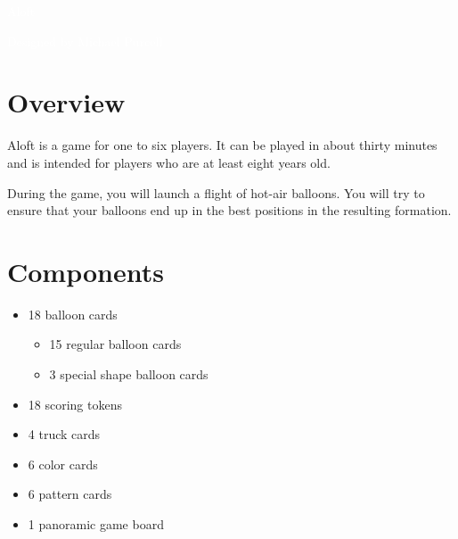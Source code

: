 \documentclass[a6paper, 11pt, parskip=half, DIV=15]{scrartcl}
\begin{document}
\begin{titlepage}

\enlargethispage{3.0\baselineskip}
\Huge
\vspace*{-1.0\baselineskip}
{
\setmainfont[Scale=2.2375]{Oi}
\begin{center}
\textcolor{white}{Aloft}
\end{center}
}
\vfill
\huge
\setmainfont[Scale=1.05]{Playball}
\begin{center}
\textcolor{white}{Designed by Michael Purcell}
\end{center}
\end{titlepage}


\ClearShipoutPicture
\enlargethispage{1.75\baselineskip}
\section*{Overview}
Aloft is a game for one to six players. It can be played in about thirty minutes and is intended for players who are at least eight years old.

During the game, you will launch a flight of hot-air balloons. You will try to ensure that your balloons end up in the best positions in the resulting formation.

\section*{Components}
\begin{itemize}[nosep]
  \item 18 balloon cards
    \begin{itemize}[nosep]
      \item 15 regular balloon cards
      \item 3 special shape balloon cards
    \end{itemize}
  \item 18 scoring tokens
  \item 4 truck cards
  \item 6 color cards
  \item 6 pattern cards
  \item 1 panoramic game board
\end{itemize}
\end{document}
